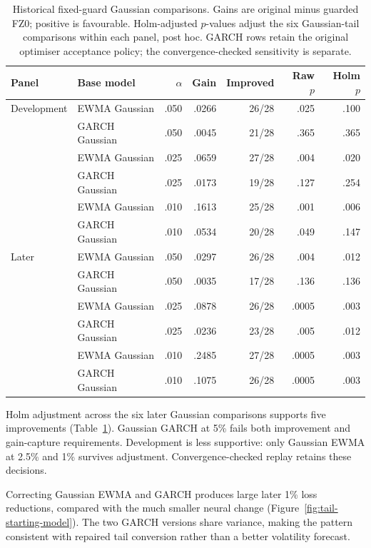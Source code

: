 \begin{table}[htbp]
\centering
\caption[Historical Gaussian-tail improvements and multiplicity]{Historical fixed-guard Gaussian comparisons. Gains are original minus guarded FZ0; positive is favourable. Holm-adjusted $p$-values adjust the six Gaussian-tail comparisons within each panel, post hoc. GARCH rows retain the original optimiser acceptance policy; the convergence-checked sensitivity is separate.}
\label{tab:tail-m1}
\small
\begin{tabular}{llrrrrr}
\toprule
Panel & Base model & $\alpha$ & Gain & Improved & Raw $p$ & Holm $p$\\
\midrule
Development & EWMA Gaussian & .050 & .0266 & 26/28 & .025 & .100\\
 & GARCH Gaussian & .050 & .0045 & 21/28 & .365 & .365\\
 & EWMA Gaussian & .025 & .0659 & 27/28 & .004 & .020\\
 & GARCH Gaussian & .025 & .0173 & 19/28 & .127 & .254\\
 & EWMA Gaussian & .010 & .1613 & 25/28 & .001 & .006\\
 & GARCH Gaussian & .010 & .0534 & 20/28 & .049 & .147\\
\midrule
Later & EWMA Gaussian & .050 & .0297 & 26/28 & .004 & .012\\
 & GARCH Gaussian & .050 & .0035 & 17/28 & .136 & .136\\
 & EWMA Gaussian & .025 & .0878 & 26/28 & .0005 & .003\\
 & GARCH Gaussian & .025 & .0236 & 23/28 & .005 & .012\\
 & EWMA Gaussian & .010 & .2485 & 27/28 & .0005 & .003\\
 & GARCH Gaussian & .010 & .1075 & 26/28 & .0005 & .003\\
\bottomrule
\end{tabular}
\end{table}

Holm adjustment across the six later Gaussian comparisons supports five improvements (Table~\ref{tab:tail-m1}). Gaussian GARCH at 5\% fails both improvement and gain-capture requirements. Development is less supportive: only Gaussian EWMA at 2.5\% and 1\% survives adjustment. Convergence-checked replay retains these decisions.

Correcting Gaussian EWMA and GARCH produces large later 1\% loss reductions, compared with the much smaller neural change (Figure~\ref{fig:tail-starting-model}). The two GARCH versions share variance, making the pattern consistent with repaired tail conversion rather than a better volatility forecast.

